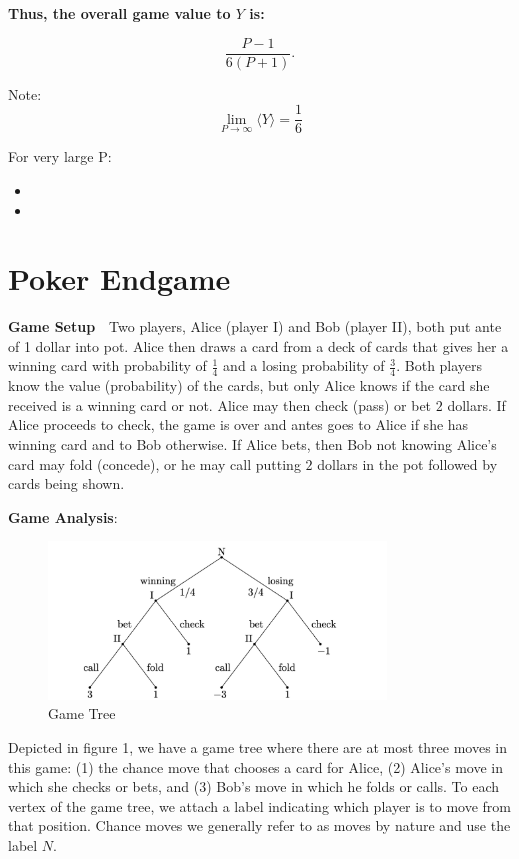 \documentclass[12pt]{article}
\begin{document}
\noindent\textbf{Thus, the overall game value to \( Y \) is:}

\[
    \frac{P - 1}{6(P + 1)}.
\]

Note:
\[
\lim_{P \to \infty} \langle Y \rangle = \frac{1}{6}
\]

For very large P:
\begin{itemize}
    \item {}
    \item {}
\end{itemize}

\section{Poker Endgame}

\hspace{\parindent}\textbf{Game Setup}~~Two players, Alice (player I) and Bob (player II), both put ante of 1 dollar into pot. Alice then draws a card from a deck of cards that gives her a winning card with probability of $\frac{1}{4}$ and a losing probability of $\frac{3}{4}$. Both players know the value (probability) of the cards, but only Alice knows if the card she received is a winning card or not. Alice may then check (pass) or bet $2$ dollars. If Alice proceeds to check, the game is over and antes goes to Alice if she has winning card and to Bob otherwise. If Alice bets, then Bob not knowing Alice's card may fold (concede), or he may call putting $2$ dollars in the pot followed by cards being shown.

\textbf{Game Analysis}: 

\begin{figure}[!htbp]
    \centering
    \includegraphics[width=0.8\textwidth]{Kuhn Tree.png}
    \caption{Game Tree}
\end{figure}

Depicted in figure 1, we have a game tree where there are at most three moves in this game: (1) the chance move that chooses a card for Alice, (2) Alice’s move in which she checks or bets, and (3) Bob’s move in which he folds or calls. To each vertex of the game tree, we attach a label indicating which player is to move from that position. Chance moves we generally refer to
as moves by nature and use the label $N$. 
\end{document}
